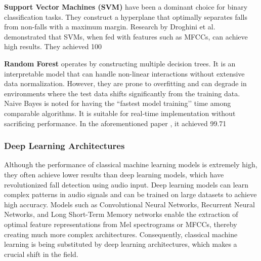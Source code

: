 \documentclass[11pt, a4paper, twoside]{article}
\begin{document}
\textbf{Support Vector Machines (SVM)} have been a dominant choice for binary classification tasks. They construct a hyperplane that optimally separates falls from non-falls with a maximum margin. Research by Droghini et al. \cite{Droghini2016} demonstrated that SVMs, when fed with features such as MFCCs, can achieve high results. They achieved 100%

\textbf{Random Forest} operates by constructing multiple decision trees. It is an interpretable model that can handle non-linear interactions without extensive data normalization. However, they are prone to overfitting and can degrade in environments where the test data shifts significantly from the training data. Naive Bayes is noted for having the ``fastest model training’’ time among comparable algorithms. It is suitable for real-time implementation without sacrificing performance. In the aforementioned paper \cite{Zerrouki2022}, it achieved 99.71%

\subsubsection{Deep Learning Architectures}
Although the performance of classical machine learning models is extremely high, they often achieve lower results than deep learning models, which have revolutionized fall detection using audio input. Deep learning models can learn complex patterns in audio signals and can be trained on large datasets to achieve high accuracy. Models such as Convolutional Neural Networks, Recurrent Neural Networks, and Long Short-Term Memory networks enable the extraction of optimal feature representations from Mel spectrograms or MFCCs, thereby creating much more complex architectures. Consequently, classical machine learning is being substituted by deep learning architectures, which makes a crucial shift in the field.
\end{document}
